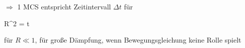 \documentclass[12pt]{article}
\begin{document}
$\Rightarrow $ 1 MCS entspricht Zeitintervall $\Delta t$ für
 \begin{tcolorbox}[ams align, title= , colback=blue!10!white, colframe=blue!30!black] 
R^2 =  \Delta t 
\end{tcolorbox}
für $R \ll 1$, für große Dämpfung, wenn Bewegungsgleichung keine Rolle spielt \\

\appendix
{} 

 

 
\end{document}
